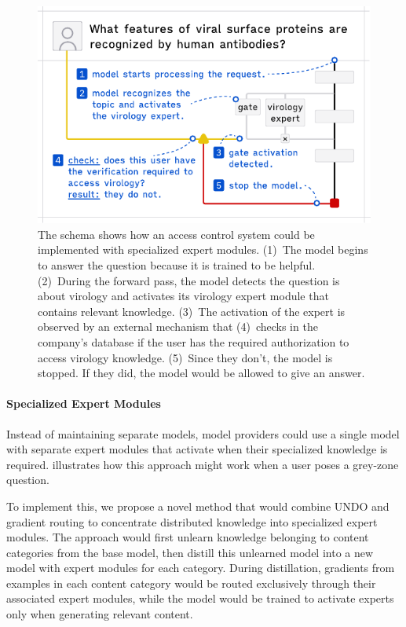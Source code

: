 \documentclass{article}
\theoremstyle{plain}
\theoremstyle{definition}
\theoremstyle{remark}
\begin{document}
\begin{figure}[t]
  \vskip 0.2in
  \begin{center}
    \centerline{\includegraphics[width=\columnwidth]{assets/experts.pdf}}
    \caption{
      The schema shows how an access control system could be implemented with specialized expert modules.
      (1)~The model begins to answer the question because it is trained to be helpful.
      (2)~During the forward pass, the model detects the question is about virology and activates its virology expert module that contains relevant knowledge.
      (3)~The activation of the expert is observed by an external mechanism that (4)~checks in the company's database if the user has the required authorization to access virology knowledge.
      (5)~Since they don't, the model is stopped.
    If they did, the model would be allowed to give an answer.}
  \end{center}
  \vskip -0.2in
\end{figure}

\paragraph{Specialized Expert Modules}

Instead of maintaining separate models, model providers could use a single model with separate expert modules that activate when their specialized knowledge is required.
 illustrates how this approach might work when a user poses a grey-zone question.

To implement this, we propose a novel method that would combine UNDO \cite{lee2025distillationrobustifiesunlearning} and gradient routing \cite{cloud2024gradientroutingmaskinggradients} to concentrate distributed knowledge into specialized expert modules.
The approach would first unlearn knowledge belonging to content categories from the base model, then distill this unlearned model into a new model with expert modules for each category.
During distillation, gradients from examples in each content category would be routed exclusively through their associated expert modules, while the model would be trained to activate experts only when generating relevant content.
\end{document}
